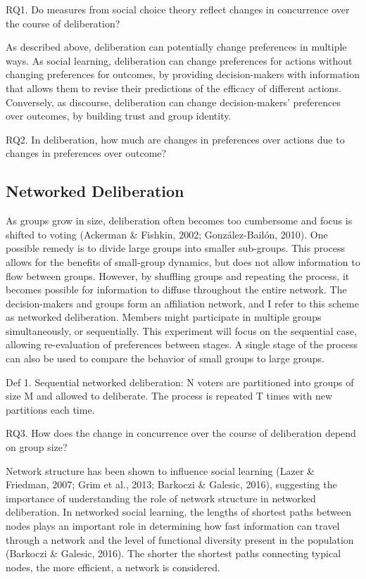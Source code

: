 RQ1. Do measures from social choice theory reflect changes in concurrence over the course of deliberation?

As described above, deliberation can potentially change preferences in multiple ways. As social learning, deliberation can change preferences for actions without changing preferences for outcomes, by providing decision-makers with information that allows them to revise their predictions of the efficacy of different actions. Conversely, as discourse, deliberation can change decision-makers’ preferences over outcomes, by building trust and group identity.

RQ2. In deliberation, how much are changes in preferences over actions due to changes in preferences over outcome?

\subsection{Networked Deliberation}
As groups grow in size, deliberation often becomes too cumbersome and focus is shifted to voting (Ackerman \& Fishkin, 2002; Gonz\'alez-Bail\'on, 2010). One possible remedy is to divide large groups into smaller sub-groups. This process allows for the benefits of small-group dynamics, but does not allow information to flow between groups. However, by shuffling groups and repeating the process, it becomes possible for information to diffuse throughout the entire network. The decision-makers and groups form an affiliation network, and I refer to this scheme as networked deliberation. Members might participate in multiple groups simultaneously, or sequentially. This experiment will focus on the sequential case, allowing re-evaluation of preferences between stages. A single stage of the process can also be used to compare the behavior of small groups to large groups.

Def 1. Sequential networked deliberation: N voters are partitioned into groups of size M and allowed to deliberate. The process is repeated T times with new partitions each time.

RQ3. How does the change in concurrence over the course of deliberation depend on group size?

Network structure has been shown to influence social learning (Lazer \& Friedman, 2007; Grim et al., 2013; Barkoczi \& Galesic, 2016), suggesting the importance of understanding the role of network structure in networked deliberation. In networked social learning, the lengths of shortest paths between nodes plays an important role in determining how fast information can travel through a network and the level of functional diversity present in the population (Barkoczi \& Galesic, 2016). The shorter the shortest paths connecting typical nodes, the more efficient, a network is considered.

